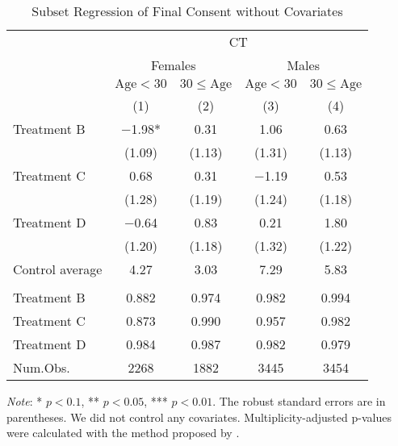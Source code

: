 \documentclass[12pt, a4paper]{article}
\begin{document}
\begin{table}[H]

\caption{\label{tab:consent-lm-subset1}Subset Regression of Final Consent without Covariates}
\centering
\fontsize{8}{10}\selectfont
\begin{threeparttable}
\begin{tabular}[t]{lcccc}
\toprule
\multicolumn{1}{c}{ } & \multicolumn{4}{c}{CT} \\
\cmidrule(l{3pt}r{3pt}){2-5}
\multicolumn{1}{c}{ } & \multicolumn{2}{c}{Females} & \multicolumn{2}{c}{Males} \\
\cmidrule(l{3pt}r{3pt}){2-3} \cmidrule(l{3pt}r{3pt}){4-5}
\multicolumn{1}{c}{ } & \multicolumn{1}{c}{$\text{Age} < 30$} & \multicolumn{1}{c}{$30 \le \text{Age}$} & \multicolumn{1}{c}{$\text{Age} < 30$} & \multicolumn{1}{c}{$30 \le \text{Age}$} \\
\cmidrule(l{3pt}r{3pt}){2-2} \cmidrule(l{3pt}r{3pt}){3-3} \cmidrule(l{3pt}r{3pt}){4-4} \cmidrule(l{3pt}r{3pt}){5-5}
  & (1) & (2) & (3) & (4)\\
\midrule
Treatment B & \num{-1.98}* & \num{0.31} & \num{1.06} & \num{0.63}\\
 & (\num{1.09}) & (\num{1.13}) & (\num{1.31}) & (\num{1.13})\\
Treatment C & \num{0.68} & \num{0.31} & \num{-1.19} & \num{0.53}\\
 & (\num{1.28}) & (\num{1.19}) & (\num{1.24}) & (\num{1.18})\\
Treatment D & \num{-0.64} & \num{0.83} & \num{0.21} & \num{1.80}\\
 & (\num{1.20}) & (\num{1.18}) & (\num{1.32}) & (\num{1.22})\\
\midrule
Control average & 4.27 & 3.03 & 7.29 & 5.83\\
\addlinespace[0.3em]
\multicolumn{5}{l}{\textit{Multiplicity-adjusted p-values}}\\
\hspace{1em}Treatment B & 0.882 & 0.974 & 0.982 & 0.994\\
\hspace{1em}Treatment C & 0.873 & 0.990 & 0.957 & 0.982\\
\hspace{1em}Treatment D & 0.984 & 0.987 & 0.982 & 0.979\\
Num.Obs. & \num{2268} & \num{1882} & \num{3445} & \num{3454}\\
\bottomrule
\end{tabular}
\begin{tablenotes}
\item \emph{Note}: * $p < 0.1$, ** $p < 0.05$, *** $p < 0.01$. The robust standard errors are in parentheses. We did not control any covariates. Multiplicity-adjusted p-values were calculated with the method proposed by \cite{List2019}.
\end{tablenotes}
\end{threeparttable}
\end{table}
\end{document}
